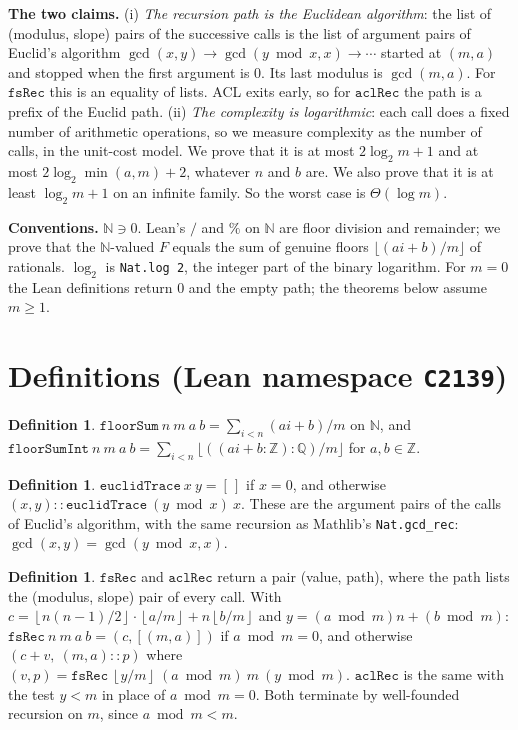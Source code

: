 \documentclass[11pt]{article}
\theoremstyle{definition}
\newtheorem{definition}[theorem]{Definition}
\newcommand{\fl}[1]{\left\lfloor #1 \right\rfloor}
\begin{document}
\textbf{The two claims.} (i) \emph{The recursion path is the Euclidean algorithm}: the list of
(modulus, slope) pairs of the successive calls is the list of argument pairs of Euclid's algorithm
$\gcd(x,y)\to\gcd(y\bmod x,x)\to\cdots$ started at $(m,a)$ and stopped when the first argument is
$0$. Its last modulus is $\gcd(m,a)$. For $\mathtt{fsRec}$ this is an equality of lists. ACL exits
early, so for $\mathtt{aclRec}$ the path is a prefix of the Euclid path.
(ii) \emph{The complexity is logarithmic}: each call does a fixed number of arithmetic operations,
so we measure complexity as the number of calls, in the unit-cost model. We prove that it is at most
$2\log_2 m+1$ and at most $2\log_2\min(a,m)+2$, whatever $n$ and $b$ are. We also prove that it is
at least $\log_2 m+1$ on an infinite family. So the worst case is $\Theta(\log m)$.

\textbf{Conventions.} $\mathbb N\ni 0$. Lean's $/$ and $\%$ on $\mathbb N$ are floor division and
remainder; we prove that the $\mathbb N$-valued $F$ equals the sum of genuine floors
$\lfloor (ai+b)/m\rfloor$ of rationals. $\log_2$ is \texttt{Nat.log 2}, the integer part of the
binary logarithm. For $m=0$ the Lean definitions return $0$ and the empty path; the theorems below
assume $m\ge1$.

\section{Definitions (Lean namespace \texttt{C2139})}

\begin{definition}
$\mathtt{floorSum}\ n\ m\ a\ b=\sum_{i<n}(a i+b)/m$ on $\mathbb N$, and
$\mathtt{floorSumInt}\ n\ m\ a\ b=\sum_{i<n}\lfloor((ai+b:\mathbb Z):\mathbb Q)/m\rfloor$ for
$a,b\in\mathbb Z$.
\end{definition}

\begin{definition}
$\mathtt{euclidTrace}\ x\ y=[\,]$ if $x=0$, and otherwise
$(x,y)::\mathtt{euclidTrace}\ (y\bmod x)\ x$. These are the argument pairs of the calls of Euclid's
algorithm, with the same recursion as Mathlib's \texttt{Nat.gcd\_rec}: $\gcd(x,y)=\gcd(y\bmod x,x)$.
\end{definition}

\begin{definition}
$\mathtt{fsRec}$ and $\mathtt{aclRec}$ return a pair (value, path), where the path lists the
(modulus, slope) pair of every call. With $c=\fl{n(n-1)/2}\cdot\fl{a/m}+n\fl{b/m}$ and
$y=(a\bmod m)n+(b\bmod m)$:
$\mathtt{fsRec}\ n\ m\ a\ b=(c,[(m,a)])$ if $a\bmod m=0$, and otherwise
$(c+v,\ (m,a)::p)$ where $(v,p)=\mathtt{fsRec}\ \fl{y/m}\ (a\bmod m)\ m\ (y\bmod m)$.
$\mathtt{aclRec}$ is the same with the test $y<m$ in place of $a\bmod m=0$.
Both terminate by well-founded recursion on $m$, since $a\bmod m<m$.
\end{definition}
\end{document}
